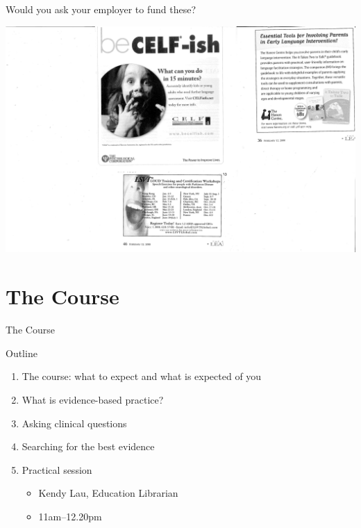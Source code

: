 \documentclass{beamer}
\begin{document}
\begin{frame} {Would you ask your employer to fund these?}
	\begin{center}
	\includegraphics[width=1.0\textwidth]{images/ASHALeader.pdf}
	\end{center}
\end{frame}

\section*{The Course}

\begin{frame}
\begin{center}
\Huge{The Course}
\end{center}
\end{frame}

\begin{frame}{Outline}
	\begin{enumerate}
	\item The course: what to expect and what is expected of you
	\item What is evidence-based practice?
	\item Asking clinical questions
	\item Searching for the best evidence
	\item Practical session
		\begin{itemize}
		\item Kendy Lau, Education Librarian
		\item 11am--12.20pm
		\end{itemize}
	\end {enumerate}
\end{frame}
\end{document}
